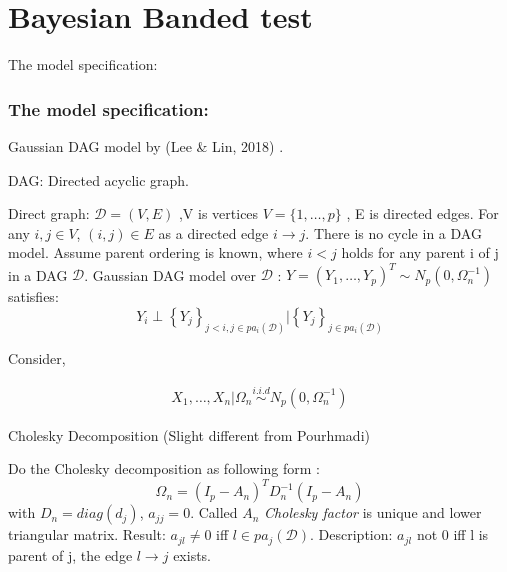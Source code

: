 \documentclass{beamer}
\begin{document}
\section{Bayesian Banded test}
\begin{frame}{The model specification:}
\subsubsection{The model specification:}
Gaussian DAG model by (Lee \& Lin, 2018) . 

DAG: Directed acyclic graph.

Direct graph: \(\mathcal { D } = ( V , E )\) ,V is vertices
\(V = \{ 1 , \ldots , p \}\) , E is directed edges. For any
\(i,j\in V\), \((i,j)\in E\) as a directed edge \(i\rightarrow j\).
There is no cycle in a DAG model. Assume parent ordering is known, where
\(i<j\) holds for any parent i of j in a DAG \(\mathcal D\). Gaussian
DAG model over \(\mathcal D\) :
\(Y = \left( Y _ { 1 } , \ldots , Y _ { p } \right) ^ { T } \sim N _ { p } \left( 0 , \Omega _ { n } ^ { - 1 } \right)\)
satisfies: \[
Y _ { i } \perp \left\{ Y _ { j } \right\} _ { j < i , j \in p a _ { i } ( \mathcal { D } ) }|  \left\{ Y _ { j } \right\} _ { j \in p a _ { i } ( \mathcal { D } ) }
\]

Consider,


\begin{align}
X _ { 1 },\ldots , X _ { n } | \Omega_{ n } \overset{i.i.d}{\sim} N _ { p } \left( 0 , \Omega _ { n } ^ { - 1 } \right)
\end{align}

\end{frame}

\begin{frame}
Cholesky Decomposition (Slight different from
Pourhmadi)

Do the Cholesky decomposition as following form : \[
\Omega _ { n } = \left( I _ { p } - A _ { n } \right) ^ { T } D _ { n } ^ { - 1 } \left( I _ { p } - A _ { n } \right)
\] with \(D_n=diag(d_j)\), \(a_{jj}=0\). Called \(A_n\) \emph{Cholesky
factor} is unique and lower triangular matrix. Result: \(a_{jl}\neq0\)
iff \(l\in pa_j(\mathcal D)\). Description: \(a_{jl}\) not 0 iff l is
parent of j, the edge \(l\rightarrow j\) exists. 
\end{frame}
\end{document}
